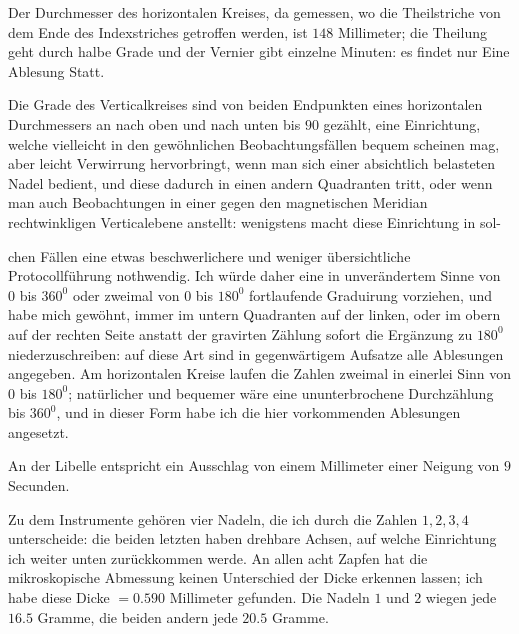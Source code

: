 Der Durchmesser des horizontalen Kreises, da gemessen, wo die Theilstriche von dem Ende des Indexstriches getroffen werden, ist $148$ Millimeter; die Theilung geht durch halbe Grade und der Vernier gibt einzelne Minuten: es findet nur Eine Ablesung Statt.

Die Grade des Verticalkreises sind von beiden Endpunkten eines horizontalen Durchmessers an nach oben und nach unten bis $90$ gezählt, eine Einrichtung, welche vielleicht in den gewöhnlichen Beobachtungsfällen bequem scheinen mag, aber leicht Verwirrung hervorbringt, wenn man sich einer absichtlich belasteten Nadel bedient, und diese dadurch in einen andern Quadranten tritt, oder wenn man auch Beobachtungen in einer gegen den magnetischen Meridian rechtwinkligen Verticalebene anstellt: wenigstens macht diese Einrichtung in sol-
\par\clearpage
{}
\noindent chen Fällen eine etwas beschwerlichere und weniger übersichtliche Protocollführung nothwendig. Ich würde daher eine in unverändertem Sinne von $0$ bis $360^0$ oder zweimal von $0$ bis $180^0$ fortlaufende Graduirung vorziehen, und habe mich gewöhnt, immer im untern Quadranten auf der linken, oder im obern auf der rechten Seite anstatt der gravirten Zählung sofort die Ergänzung zu $180^0$ niederzuschreiben: auf diese Art sind in gegenwärtigem Aufsatze alle Ablesungen angegeben. Am horizontalen Kreise laufen die Zahlen zweimal in einerlei Sinn von $0$ bis $180^0$; natürlicher und bequemer wäre eine ununterbrochene Durchzählung bis $360^0$, und in dieser Form habe ich die hier vorkommenden Ablesungen angesetzt.

An der Libelle entspricht ein Ausschlag von einem Millimeter einer Neigung von $9$ Secunden.

Zu dem Instrumente gehören vier Nadeln, die ich durch die Zahlen $1,2,3,4$ unterscheide: die beiden letzten haben drehbare Achsen, auf welche Einrichtung ich weiter unten zurückkommen werde. An allen acht Zapfen hat die mikroskopische Abmessung keinen Unterschied der Dicke erkennen lassen; ich habe diese Dicke $=0.590$ Millimeter gefunden. Die Nadeln $1$ und $2$ wiegen jede $16.5$ Gramme, die beiden andern jede $20.5$ Gramme.

